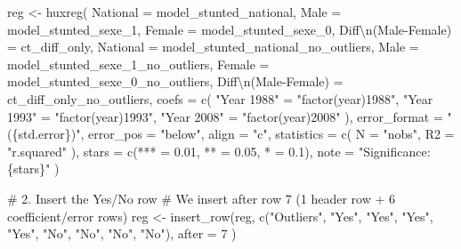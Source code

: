 \documentclass[
  letterpaper,
  DIV=11,
  numbers=noendperiod]{scrartcl}
\newenvironment{Shaded}{\begin{snugshade}}{\end{snugshade}}
\newcommand{\AttributeTok}[1]{\textcolor[rgb]{0.40,0.45,0.13}{#1}}
\newcommand{\CommentTok}[1]{\textcolor[rgb]{0.37,0.37,0.37}{#1}}
\newcommand{\DecValTok}[1]{\textcolor[rgb]{0.68,0.00,0.00}{#1}}
\newcommand{\FloatTok}[1]{\textcolor[rgb]{0.68,0.00,0.00}{#1}}
\newcommand{\FunctionTok}[1]{\textcolor[rgb]{0.28,0.35,0.67}{#1}}
\newcommand{\NormalTok}[1]{\textcolor[rgb]{0.00,0.23,0.31}{#1}}
\newcommand{\OtherTok}[1]{\textcolor[rgb]{0.00,0.23,0.31}{#1}}
\newcommand{\SpecialCharTok}[1]{\textcolor[rgb]{0.37,0.37,0.37}{#1}}
\newcommand{\StringTok}[1]{\textcolor[rgb]{0.13,0.47,0.30}{#1}}
\begin{document}
\begin{Shaded}
\begin{Highlighting}[]
\NormalTok{reg }\OtherTok{\textless{}{-}} \FunctionTok{huxreg}\NormalTok{(}
  \StringTok{\textasciigrave{}}\AttributeTok{National}\StringTok{\textasciigrave{}}             \OtherTok{=}\NormalTok{ model\_stunted\_national,}
  \StringTok{\textasciigrave{}}\AttributeTok{Male}\StringTok{\textasciigrave{}}                \OtherTok{=}\NormalTok{ model\_stunted\_sexe\_1,}
  \StringTok{\textasciigrave{}}\AttributeTok{Female}\StringTok{\textasciigrave{}}                \OtherTok{=}\NormalTok{ model\_stunted\_sexe\_0,}
  \StringTok{\textasciigrave{}}\AttributeTok{Diff}\SpecialCharTok{\textbackslash{}n}\AttributeTok{(Male{-}Female)}\StringTok{\textasciigrave{}}  \OtherTok{=}\NormalTok{ ct\_diff\_only,}
  \StringTok{\textasciigrave{}}\AttributeTok{National }\StringTok{\textasciigrave{}}            \OtherTok{=}\NormalTok{ model\_stunted\_national\_no\_outliers,}
  \StringTok{\textasciigrave{}}\AttributeTok{Male }\StringTok{\textasciigrave{}}               \OtherTok{=}\NormalTok{ model\_stunted\_sexe\_1\_no\_outliers,}
  \StringTok{\textasciigrave{}}\AttributeTok{Female }\StringTok{\textasciigrave{}}               \OtherTok{=}\NormalTok{ model\_stunted\_sexe\_0\_no\_outliers,}
  \StringTok{\textasciigrave{}}\AttributeTok{Diff}\SpecialCharTok{\textbackslash{}n}\AttributeTok{(Male{-}Female) }\StringTok{\textasciigrave{}}  \OtherTok{=}\NormalTok{ ct\_diff\_only\_no\_outliers,}
   \AttributeTok{coefs =} \FunctionTok{c}\NormalTok{(}
    \StringTok{"Year 1988"} \OtherTok{=} \StringTok{"factor(year)1988"}\NormalTok{,}
    \StringTok{"Year 1993"} \OtherTok{=} \StringTok{"factor(year)1993"}\NormalTok{,}
    \StringTok{"Year 2008"} \OtherTok{=} \StringTok{"factor(year)2008"}
\NormalTok{  ),}
  \AttributeTok{error\_format =} \StringTok{"(\{std.error\})"}\NormalTok{,}
  \AttributeTok{error\_pos =} \StringTok{"below"}\NormalTok{,}
  \AttributeTok{align =} \StringTok{"c"}\NormalTok{,}
  \AttributeTok{statistics =} \FunctionTok{c}\NormalTok{(}
    \AttributeTok{N =} \StringTok{"nobs"}\NormalTok{,}
    \AttributeTok{R2 =} \StringTok{"r.squared"}
\NormalTok{  ),}
  \AttributeTok{stars =} \FunctionTok{c}\NormalTok{(}\StringTok{\textasciigrave{}}\AttributeTok{***}\StringTok{\textasciigrave{}} \OtherTok{=} \FloatTok{0.01}\NormalTok{, }\StringTok{\textasciigrave{}}\AttributeTok{**}\StringTok{\textasciigrave{}} \OtherTok{=} \FloatTok{0.05}\NormalTok{, }\StringTok{\textasciigrave{}}\AttributeTok{*}\StringTok{\textasciigrave{}} \OtherTok{=} \FloatTok{0.1}\NormalTok{),}
  \AttributeTok{note =} \StringTok{"Significance: \{stars\}"}
\NormalTok{)}

\CommentTok{\# 2. Insert the Yes/No row}
\CommentTok{\# We insert after row 7 (1 header row + 6 coefficient/error rows)}
\NormalTok{reg }\OtherTok{\textless{}{-}} \FunctionTok{insert\_row}\NormalTok{(reg, }
  \FunctionTok{c}\NormalTok{(}\StringTok{"Outliers"}\NormalTok{, }\StringTok{"Yes"}\NormalTok{, }\StringTok{"Yes"}\NormalTok{, }\StringTok{"Yes"}\NormalTok{, }\StringTok{"Yes"}\NormalTok{, }\StringTok{"No"}\NormalTok{, }\StringTok{"No"}\NormalTok{, }\StringTok{"No"}\NormalTok{, }\StringTok{"No"}\NormalTok{), }
  \AttributeTok{after =} \DecValTok{7}
\NormalTok{)}


\end{Highlighting}
\end{Shaded}
\end{document}
